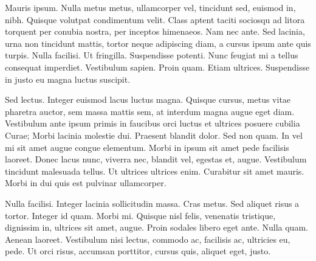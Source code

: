 Mauris ipsum. Nulla metus metus, ullamcorper vel, tincidunt sed, euismod
in, nibh. Quisque volutpat condimentum velit. Class aptent taciti
sociosqu ad litora torquent per conubia nostra, per inceptos himenaeos.
Nam nec ante. Sed lacinia, urna non tincidunt mattis, tortor neque
adipiscing diam, a cursus ipsum ante quis turpis. Nulla facilisi. Ut
fringilla. Suspendisse potenti. Nunc feugiat mi a tellus consequat
imperdiet. Vestibulum sapien. Proin quam. Etiam ultrices. Suspendisse in
justo eu magna luctus suscipit.

Sed lectus. Integer euismod lacus luctus magna. Quisque cursus, metus
vitae pharetra auctor, sem massa mattis sem, at interdum magna augue
eget diam. Vestibulum ante ipsum primis in faucibus orci luctus et
ultrices posuere cubilia Curae; Morbi lacinia molestie dui. Praesent
blandit dolor. Sed non quam. In vel mi sit amet augue congue elementum.
Morbi in ipsum sit amet pede facilisis laoreet. Donec lacus nunc,
viverra nec, blandit vel, egestas et, augue. Vestibulum tincidunt
malesuada tellus. Ut ultrices ultrices enim. Curabitur sit amet mauris.
Morbi in dui quis est pulvinar ullamcorper.

Nulla facilisi. Integer lacinia sollicitudin massa. Cras metus. Sed
aliquet risus a tortor. Integer id quam. Morbi mi. Quisque nisl felis,
venenatis tristique, dignissim in, ultrices sit amet, augue. Proin
sodales libero eget ante. Nulla quam. Aenean laoreet. Vestibulum nisi
lectus, commodo ac, facilisis ac, ultricies eu, pede. Ut orci risus,
accumsan porttitor, cursus quis, aliquet eget, justo.
